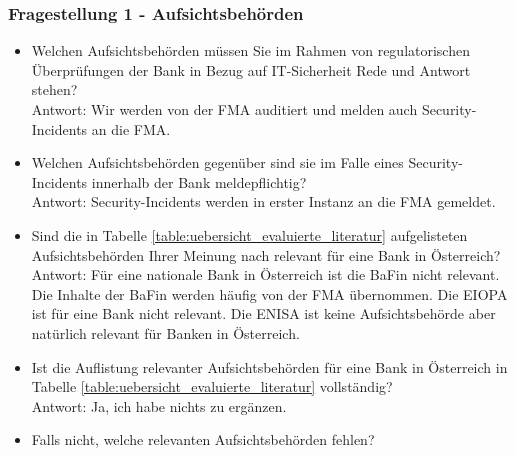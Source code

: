\subsubsection{Fragestellung 1 - Aufsichtsbehörden}
\begin{itemize}
    \item Welchen Aufsichtsbehörden müssen Sie im Rahmen von regulatorischen Überprüfungen der Bank in Bezug auf IT-Sicherheit Rede und Antwort stehen?\\
    Antwort: Wir werden von der FMA auditiert und melden auch Security-Incidents an die FMA.\\
    \item Welchen Aufsichtsbehörden gegenüber sind sie im Falle eines Security-Incidents innerhalb der Bank meldepflichtig?\\
    Antwort: Security-Incidents werden in erster Instanz an die FMA gemeldet.\\
    \item Sind die in Tabelle \ref{table:uebersicht_evaluierte_literatur} aufgelisteten Aufsichtsbehörden Ihrer Meinung nach relevant für eine Bank in Österreich?\\
    Antwort: Für eine nationale Bank in Österreich ist die BaFin nicht relevant. Die Inhalte der BaFin werden häufig von der FMA übernommen. Die EIOPA ist für eine Bank nicht relevant. Die ENISA ist keine Aufsichtsbehörde aber natürlich relevant für Banken in Österreich.\\
    \item Ist die Auflistung relevanter Aufsichtsbehörden für eine Bank in Österreich in Tabelle \ref{table:uebersicht_evaluierte_literatur} vollständig?\\
    Antwort: Ja, ich habe nichts zu ergänzen.\\
    \item Falls nicht, welche relevanten Aufsichtsbehörden fehlen?
\end{itemize}
